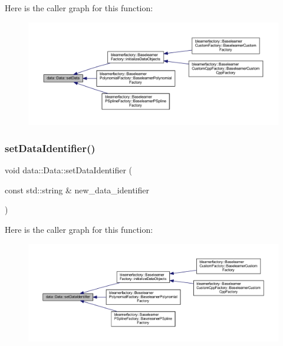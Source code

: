 Here is the caller graph for this function\+:\nopagebreak
\begin{figure}[H]
\begin{center}
\leavevmode
\includegraphics[width=350pt]{classdata_1_1_data_a0e928c49b31f803e7984cc24e2f73f70_icgraph}
\end{center}
\end{figure}
\mbox{\label{classdata_1_1_data_a62bcea680e1a7d1d4ecec60c111936dc}} 
\subsubsection{\texorpdfstring{set\+Data\+Identifier()}{setDataIdentifier()}}
{\footnotesize\ttfamily void data\+::\+Data\+::set\+Data\+Identifier (\begin{DoxyParamCaption}\item[{const std\+::string \&}]{new\+\_\+data\+\_\+identifier }\end{DoxyParamCaption})}

Here is the caller graph for this function\+:\nopagebreak
\begin{figure}[H]
\begin{center}
\leavevmode
\includegraphics[width=350pt]{classdata_1_1_data_a62bcea680e1a7d1d4ecec60c111936dc_icgraph}
\end{center}
\end{figure}
\mbox{\label{classdata_1_1_data_a349569c170c7e8b78bf4997b47e3f1a8}} 
